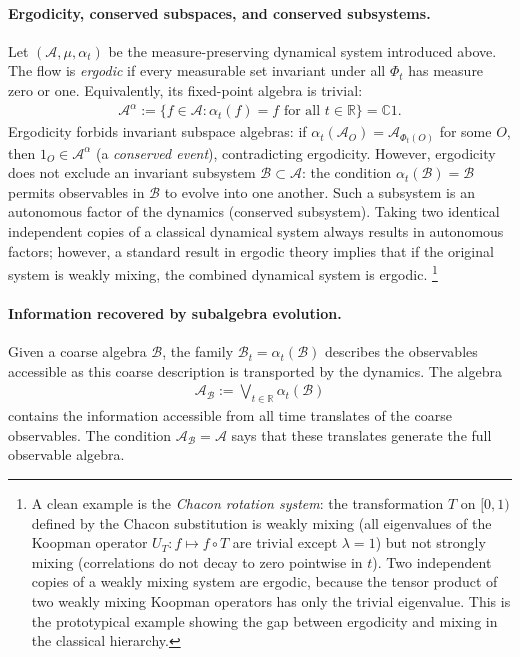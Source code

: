 \documentclass[a4paper,11pt]{article}
\theoremstyle{definition}
\theoremstyle{remark}
\newcommand{\mA}{\mathcal{A}}
\newcommand{\mB}{\mathcal{B}}
\begin{document}
\paragraph{Ergodicity, conserved subspaces, and conserved subsystems.}
Let $(\mA,\mu,\alpha_t)$ be the measure-preserving dynamical system introduced above.
The flow is \emph{ergodic} if every measurable set invariant under all $\Phi_t$ has
measure zero or one.  Equivalently, its fixed-point algebra is trivial:
\begin{align}
    \mA^\alpha
    :=\{f\in\mA:\alpha_t(f)=f\text{ for all }t\in\mathbb{R}\}
    =\mathbb{C}1.
\end{align}
Ergodicity forbids invariant subspace algebras: if $\alpha_t(\mA_O)=\mA_{\Phi_t(O)}$
for some $O$, then $1_O\in\mA^\alpha$ (a \emph{conserved event}), contradicting
ergodicity.  However, ergodicity does not exclude an invariant subsystem
$\mB\subset\mA$: the condition $\alpha_t(\mB)=\mB$ permits observables in $\mB$ to
evolve into one another.  Such a subsystem is an autonomous factor of the dynamics
(conserved subsystem).  Taking two identical independent copies of a classical
dynamical system always results in autonomous factors; however, a standard result in
ergodic theory implies that if the original system is weakly mixing, the combined
dynamical system is ergodic.%
\footnote{A clean example is the \emph{Chacon rotation system}: the transformation
  $T$ on $[0,1)$ defined by the Chacon substitution is weakly mixing (all eigenvalues
  of the Koopman operator $U_T:f\mapsto f\circ T$ are trivial except $\lambda=1$) but
  not strongly mixing (correlations do not decay to zero pointwise in $t$).  Two
  independent copies of a weakly mixing system are ergodic, because the tensor product
  of two weakly mixing Koopman operators has only the trivial eigenvalue.  This is the
  prototypical example showing the gap between ergodicity and mixing in the classical
  hierarchy.}
 
\paragraph{Information recovered by subalgebra evolution.}
Given a coarse algebra $\mB$, the family $\mB_t=\alpha_t(\mB)$ describes the
observables accessible as this coarse description is transported by the dynamics.  The
algebra
\begin{align}
    \mA_{\mB}:=\bigvee_{t\in\mathbb{R}}\alpha_t(\mB)
\end{align}
contains the information accessible from all time translates of the coarse observables.
The condition $\mA_{\mB}=\mA$ says that these translates generate the full observable
algebra.
 
\end{document}
